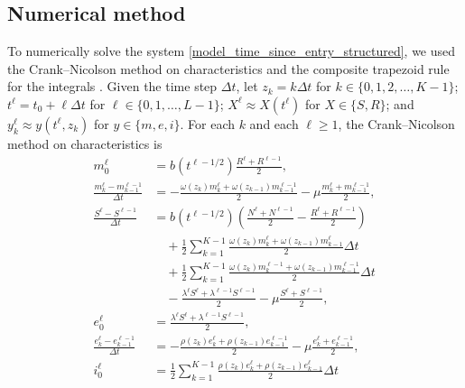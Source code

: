 \documentclass{jpmarticle}
\begin{document}
\subsection{Numerical method}

To numerically solve the system
\eqref{model_time_since_entry_structured}, we used the Crank--Nicolson
method on characteristics and the composite trapezoid rule for the
integrals \autocite{milner_1992}.  Given the time step $\Delta t$,
let $z_k = k \Delta t$
for $k \in \{0, 1, 2, \ldots, K - 1\}$;
$t^{\ell} = t_0 + \ell \Delta t$
for $\ell \in \{0, 1, \ldots, L - 1\}$;
$X^{\ell} \approx X(t^{\ell})$
for $X \in \{S, R\}$;
and $y_k^{\ell} \approx y(t^{\ell}, z_k)$
for $y \in \{m, e, i\}$.
For each $k$ and each $\ell \geq 1$, the Crank--Nicolson method on
characteristics is
\begin{equation}
  \begin{split}
    m_0^{\ell} &=
    b(t^{\ell - 1 / 2}) \frac{R^{\ell} + R^{\ell - 1}}{2},
    \\
    \frac{m_k^{\ell} - m_{k - 1}^{\ell - 1}}{\Delta t} &=
    - \frac{\omega(z_k) m_k^{\ell} + \omega(z_{k - 1}) m_{k - 1}^{\ell - 1}}{2}
    - \mu \frac{m_k^{\ell} + m_{k - 1}^{\ell - 1}}{2},
    \\
    \frac{S^{\ell} - S^{\ell - 1}}{\Delta t} &=
    b(t^{\ell - 1 / 2}) \left(\frac{N^{\ell} + N^{\ell - 1}}{2}
      - \frac{R^{\ell} + R^{\ell - 1}}{2}\right)
    \\ & \quad {}
    + \frac{1}{2} \sum_{k = 1}^{K - 1}
    \frac{\omega(z_k) m_k^{\ell} + \omega(z_{k - 1}) m_{k - 1}^{\ell}}{2}
    \Delta t
    \\ & \quad {}
    + \frac{1}{2} \sum_{k = 1}^{K - 1}
    \frac{\omega(z_k) m_k^{\ell - 1} + \omega(z_{k - 1}) m_{k - 1}^{\ell - 1}}{2}
    \Delta t
    \\ & \quad {}
    - \frac{\lambda^{\ell} S^{\ell} + \lambda^{\ell - 1} S^{\ell - 1}}{2}
    - \mu \frac{S^{\ell} + S^{\ell - 1}}{2},
    \\
    e_0^{\ell} &=
    \frac{\lambda^{\ell} S^{\ell} + \lambda^{\ell - 1} S^{\ell - 1}}{2},
    \\
    \frac{e_k^{\ell} - e_{k - 1}^{\ell - 1}}{\Delta t} &=
    - \frac{\rho(z_k) e_k^{\ell} + \rho(z_{k - 1}) e_{k - 1}^{\ell - 1}}{2}
    - \mu \frac{e_k^{\ell} + e_{k - 1}^{\ell - 1}}{2},
    \\
    i_0^{\ell} &=
    \frac{1}{2} \sum_{k = 1}^{K - 1}
    \frac{\rho(z_k) e_k^{\ell} + \rho(z_{k - 1}) e_{k - 1}^{\ell}}{2}
    \Delta t
    \\ & \quad {}

\end{split}
\end{equation}
\end{document}
